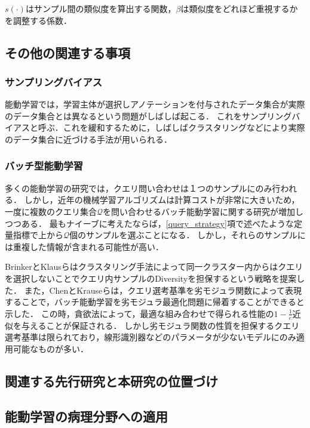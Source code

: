 $s(\cdot)$はサンプル間の類似度を算出する関数，$\beta$は類似度をどれほど重視するかを調整する係数．

\subsection{その他の関連する事項}
\subsubsection{サンプリングバイアス}
能動学習では，学習主体が選択しアノテーションを付与されたデータ集合が実際のデータ集合とは異なるという問題がしばしば起こる．
これをサンプリングバイアスと呼ぶ．これを緩和するために，しばしばクラスタリングなどにより実際のデータ集合に近づける手法が用いられる．

\subsubsection{バッチ型能動学習}
多くの能動学習の研究では，クエリ問い合わせは１つのサンプルにのみ行われる．
しかし，近年の機械学習アルゴリズムは計算コストが非常に大きいため，一度に複数のクエリ集合$\mathcal{Q}$を問い合わせるバッチ能動学習に関する研究が増加しつつある．
最もナイーブに考えたならば，\ref{query_strategy}項で述べたような定量指標で上から$\mathcal{Q}$個のサンプルを選ぶことになる．
しかし，それらのサンプルには重複した情報が含まれる可能性が高い．

BrinkerとKlausらはクラスタリング手法によって同一クラスター内からはクエリを選択しないことでクエリ内サンプルのDiversityを担保するという戦略を提案した\cite{brinker2003incorporating}．
また，ChenとKrauseらは，クエリ選考基準を劣モジュラ関数によって表現することで，バッチ能動学習を劣モジュラ最適化問題に帰着することができると示した\cite{chen2013near}．
この時，貪欲法によって，最適な組み合わせで得られる性能の$1 - \frac{1}{e}$近似を与えることが保証される．
しかし劣モジュラ関数の性質を担保するクエリ選考基準は限られており，線形識別器などのパラメータが少ないモデルにのみ適用可能なものが多い．

\subsection{関連する先行研究と本研究の位置づけ}

\subsection{能動学習の病理分野への適用}

